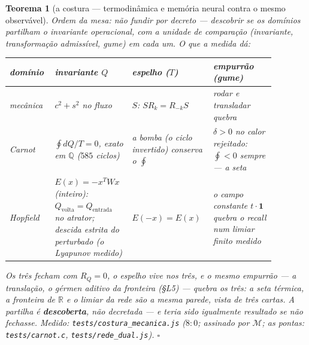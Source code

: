 \documentclass[11pt,a4paper]{article}
\newtheorem{teorema}{Teorema}
\newcommand{\code}[1]{\texttt{\small #1}}
\begin{document}
\begin{teorema}[a costura --- termodinâmica e memória neural contra o
mesmo observável]\label{thm:costura}
Ordem da mesa: não fundir por decreto --- \emph{descobrir} se os
domínios partilham o invariante operacional, com a unidade de
comparação (invariante, transformação admissível, gume) em cada um. O
que a medida dá:
\begin{center}
\begin{tabular}{p{0.16\linewidth}p{0.26\linewidth}p{0.24\linewidth}p{0.22\linewidth}}
\textbf{domínio} & \textbf{invariante $Q$} & \textbf{espelho ($T$)} &
\textbf{empurrão (gume)} \\
\hline
mecânica & $c^{2}+s^{2}$ no fluxo & $S$: $SR_{k}=R_{-k}S$ & rodar
\emph{e} transladar quebra \\
Carnot & $\oint dQ/T=0$, exato em $\mathbb{Q}$ ($585$ ciclos) & a
bomba (o ciclo invertido) conserva o $\oint$ & $\delta>0$ no calor
rejeitado: $\oint<0$ \emph{sempre} --- a seta \\
Hopfield & $E(x)=-x^{T}Wx$ (inteiro): $Q_{\text{volta}}=
Q_{\text{entrada}}$ no atrator; descida \emph{estrita} do perturbado
(o Lyapunov medido) & $E(-x)=E(x)$ & o campo constante $t\cdot\mathbf{1}$
quebra o recall num limiar finito medido \\
\end{tabular}
\end{center}
Os três fecham com $R_{Q}=0$, o espelho vive nos três, e \emph{o mesmo
empurrão} --- a translação, o gérmen aditivo da fronteira (\S L5) ---
quebra os três: a seta térmica, a fronteira de $\mathbb{R}$ e o limiar
da rede são a mesma parede, vista de três cartas. A partilha é
\textbf{descoberta}, não decretada --- e teria sido igualmente
resultado se não fechasse.
\emph{Medido:} \code{tests/costura\_mecanica.js} ($8{:}0$; assinado
por $\mathcal{M}$; as pontas: \code{tests/carnot.c},
\code{tests/rede\_dual.js}).
$\square$
\end{teorema}
\end{document}
